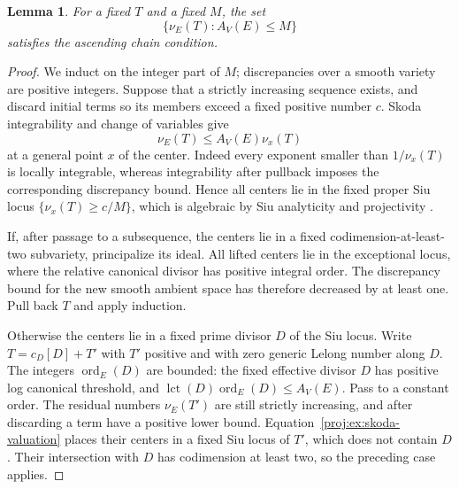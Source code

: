 \documentclass[11pt,letterpaper]{article}
\newtheorem{lemma}[theorem]{Lemma}
\theoremstyle{definition}
\theoremstyle{remark}
\begin{document}
\begin{lemma}\label{proj:ex:valuation-acc}
For a fixed \(T\) and a fixed \(M\), the set
\[
 \{\nu_E(T): A_V(E)\leq M\}
\]
satisfies the ascending chain condition.
\end{lemma}
\begin{proof}
We induct on the integer part of \(M\); discrepancies over a
smooth variety are positive integers. Suppose that a strictly
increasing sequence exists, and discard initial terms so its
members exceed a fixed positive number \(c\).
Skoda integrability and change of variables give
\begin{equation}\label{proj:ex:skoda-valuation}
 \nu_E(T)\leq A_V(E)\nu_x(T)
\end{equation}
at a general point \(x\) of the center. Indeed every exponent
smaller than \(1/\nu_x(T)\) is locally integrable, whereas
integrability after pullback imposes the corresponding
discrepancy bound. Hence all centers lie in the fixed proper Siu
locus \(\{\nu_x(T)\geq c/M\}\), which is algebraic by Siu
analyticity and projectivity \cite{Proj-Siu1974}.

If, after passage to a subsequence, the centers lie in a fixed
codimension-at-least-two subvariety, principalize its ideal.
All lifted centers lie in the exceptional locus, where the
relative canonical divisor has positive integral order.
The discrepancy bound for the new smooth ambient space has
therefore decreased by at least one. Pull back \(T\) and apply
induction.

Otherwise the centers lie in a fixed prime divisor \(D\) of the
Siu locus. Write \(T=c_D[D]+T'\) with \(T'\) positive and with
zero generic Lelong number along \(D\). The integers
\(\operatorname{ord}_E(D)\) are bounded: the fixed effective divisor \(D\) has
positive log canonical threshold, and
\(\operatorname{lct}(D)\operatorname{ord}_E(D)\leq A_V(E)\).
Pass to a constant order. The residual numbers \(\nu_E(T')\)
are still strictly increasing, and after discarding a term have
a positive lower bound. Equation~\eqref{proj:ex:skoda-valuation}
places their centers in a fixed Siu locus of \(T'\), which does
not contain \(D\). Their intersection with \(D\) has codimension
at least two, so the preceding case applies.
\end{proof}
\end{document}
